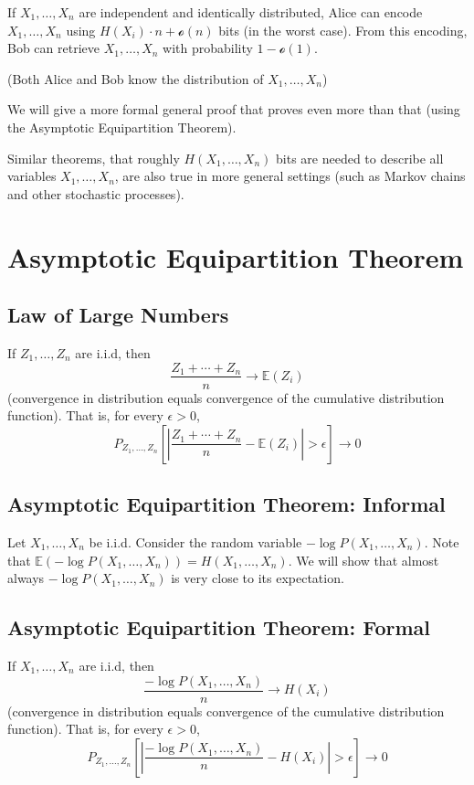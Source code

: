 \documentclass{article}
\begin{document}
If $X_1,\ldots,X_n$ are independent and identically distributed, Alice can encode $X_1,\ldots,X_n$ using $H(X_i)\cdot n + \mathcal{o }(n)$ bits (in the worst case). From this encoding, Bob can retrieve $X_1,\ldots, X_n$ with probability $1-\mathcal{o }(1)$.

(Both Alice and Bob know the distribution of $X_1,\ldots, X_n$)

We will give a more formal general proof that proves even more than that (using the Asymptotic Equipartition Theorem).

Similar theorems, that roughly $H(X_1,\ldots, X_n)$ bits are needed to describe all variables $X_1,\ldots, X_n$, are also true in more general settings (such as Markov chains and other stochastic processes).

\section{Asymptotic Equipartition Theorem}

\subsection{Law of Large Numbers}

If $Z_1,\ldots,Z_n$ are i.i.d, then 
\[
\frac{Z_1 + \cdots + Z_n}{n}\to \mathbb{E}(Z_i)
\]
(convergence in distribution equals convergence of the cumulative distribution function). That is, for every $\epsilon > 0$,
\[
P_{Z_1,\ldots,Z_n}\left[ | \frac{Z_1 + \cdots + Z_n}{n} - \mathbb{E}(Z_i) |>\epsilon \right] \to 0
\]

\subsection{Asymptotic Equipartition Theorem: Informal}

Let $X_1,\ldots,X_n$ be i.i.d. Consider the random variable $-\log P\left(X_1,\ldots, X_n\right)$. Note that $\mathbb{E}\left(-\log P\left(X_1,\ldots, X_n\right) \right)=H(X_1,\ldots,X_n)$. We will show that almost always $-\log P\left(X_1,\ldots, X_n\right)$ is very close to its expectation.

\subsection{Asymptotic Equipartition Theorem: Formal}

If $X_1,\ldots, X_n$ are i.i.d, then 
\[
\frac{-\log P(X_1,\ldots, X_n)}{n}\to H(X_i)
\]
(convergence in distribution equals convergence of the cumulative distribution function). That is, for every $\epsilon > 0$,
\[
P_{Z_1,\ldots,Z_n}\left[ | \frac{-\log P(X_1,\ldots, X_n)}{n} - H(X_i) |>\epsilon \right] \to 0
\]
\end{document}
